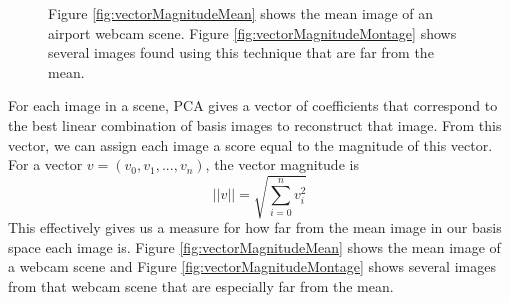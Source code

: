 \begin{figure}
	\centering
		\caption[Criteria: Gradient Magnitude.]{Figure \ref{fig:vectorMagnitudeMean} shows the mean image of an airport webcam scene. Figure \ref{fig:vectorMagnitudeMontage} shows several images found using this technique that are far from the mean.}
\end{figure}

For each image in a scene, PCA gives a vector of coefficients that correspond to the best linear combination of basis images to reconstruct that image.  From this vector, we can assign each image a score equal to the magnitude of this vector.  For a vector $v = (v_0, v_1, ..., v_n)$, the vector magnitude is $$||v||=\sqrt{\sum_{i=0}^nv_i^2}$$This effectively gives us a measure for how far from the mean image in our basis space each image is.  Figure \ref{fig:vectorMagnitudeMean} shows the mean image of a webcam scene and Figure \ref{fig:vectorMagnitudeMontage} shows several images from that webcam scene that are especially far from the mean.



